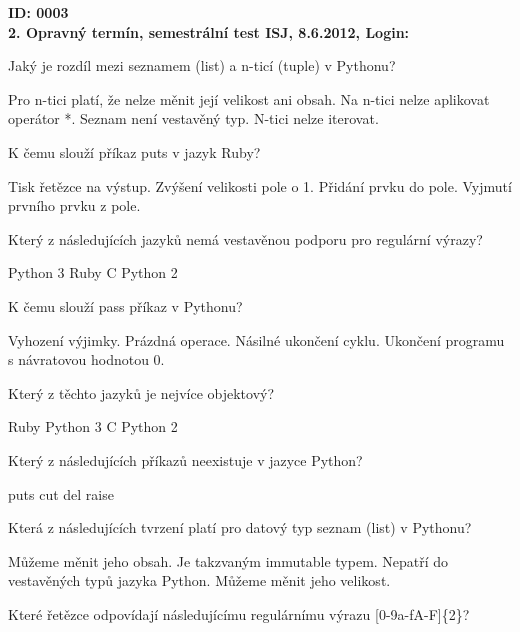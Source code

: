 \documentclass[addpoints,12pt]{exam}
\begin{document}
\setlength{\parindent}{0in}
\pagestyle{empty}
\textbf{ID: 0003}
\\
\textbf{2. Opravný termín, semestrální test ISJ, 8.6.2012, Login:}
\\
\hrulefill
\begin{questions}

\question[2]
Jaký je rozdíl mezi seznamem (list) a n-ticí (tuple) v Pythonu?
\nopagebreak
\begin{choices}
\choice
Pro n-tici platí, že nelze měnit její velikost ani obsah.
\choice
Na n-tici nelze aplikovat operátor *.
\choice
Seznam není vestavěný typ.
\choice
N-tici nelze iterovat.
\end{choices}
\question[2]
K čemu slouží příkaz puts v jazyk Ruby?
\nopagebreak
\begin{choices}
\choice
Tisk řetězce na výstup.
\choice
Zvýšení velikosti pole o 1.
\choice
Přidání prvku do pole.
\choice
Vyjmutí prvního prvku z pole.
\end{choices}
\question[2]
Který z následujících jazyků nemá vestavěnou podporu pro regulární výrazy?
\nopagebreak
\begin{choices}
\choice
Python 3
\choice
Ruby
\choice
C
\choice
Python 2
\end{choices}
\question[2]
K čemu slouží pass příkaz v Pythonu?
\nopagebreak
\begin{choices}
\choice
Vyhození výjimky.
\choice
Prázdná operace.
\choice
Násilné ukončení cyklu.
\choice
Ukončení programu s návratovou hodnotou 0.
\end{choices}
\question[2]
Který z těchto jazyků je nejvíce objektový?
\nopagebreak
\begin{choices}
\choice
Ruby
\choice
Python 3
\choice
C
\choice
Python 2
\end{choices}
\question[2]
Který z následujících příkazů neexistuje v jazyce Python?
\nopagebreak
\begin{choices}
\choice
puts
\choice
cut
\choice
del
\choice
raise
\end{choices}
\question[2]
Která z následujících tvrzení platí pro datový typ seznam (list) v Pythonu?
\nopagebreak
\begin{choices}
\choice
Můžeme měnit jeho obsah.
\choice
Je takzvaným immutable typem.
\choice
Nepatří do vestavěných typů jazyka Python.
\choice
Můžeme měnit jeho velikost.
\end{choices}
\question[2]
Které řetězce odpovídají následujícímu regulárnímu výrazu [0-9a-fA-F]\{2\}?
\nopagebreak
\begin{choices}

\end{choices}
\end{questions}
\end{document}

